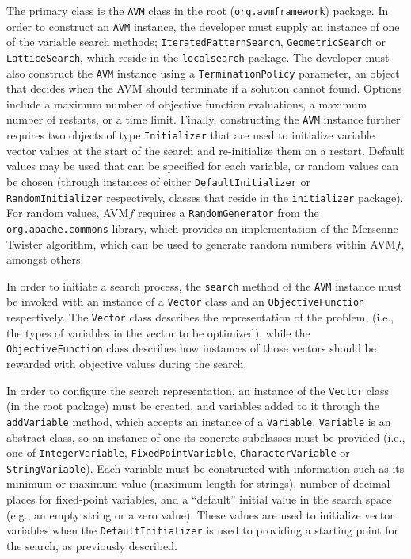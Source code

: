 \documentclass{llncs}
\newcommand{\name}{AVM\hspace{-1pt}$f$\xspace}
\newcommand{\inlineheading}[1]{\vspace{1mm} \noindent {\bf #1.}}
\begin{document}
\begin{sloppypar}
\inlineheading{Configuring an AVM search} The primary class is the {\tt AVM} class in the root ({\tt org.avmframework}) package. In order to construct an {\tt AVM} instance, the developer must supply an instance of one of the variable search methods; {\tt IteratedPatternSearch}, {\tt GeometricSearch} or {\tt LatticeSearch}, which reside in the {\tt localsearch} package. The developer must also construct the {\tt AVM} instance using a {\tt TerminationPolicy} parameter, an object that decides when the AVM should terminate if a solution cannot found. Options include a maximum number of objective function evaluations, a maximum number of restarts, or a time limit. Finally, constructing the {\tt AVM} instance further requires two objects of type {\tt Initializer} that are used to initialize variable vector values at the start of the search and re-initialize them on a restart. Default values may be used that can be specified for each variable, or random values can be chosen (through instances of either {\tt DefaultInitializer} or {\tt RandomInitializer} respectively, classes that reside in the {\tt initializer} package). For random values, \name requires a {\tt RandomGenerator} from the {\tt org.apache.commons} library, which provides an implementation of the Mersenne Twister algorithm, which can be used to generate random numbers within \name, amongst others.
\end{sloppypar}

\begin{sloppypar}
In order to initiate a search process, the {\tt search} method of the {\tt AVM} instance must be invoked with an instance of a {\tt Vector} class and an {\tt ObjectiveFunction} respectively. The {\tt Vector} class describes the representation of the problem,
(i.e., the types of variables in the vector to be optimized), while the {\tt ObjectiveFunction} class describes how instances of those vectors should be rewarded with objective values during the search.
\end{sloppypar}

\begin{sloppypar}
\inlineheading{Representation} In order to configure the search representation, an instance of the {\tt Vector} class (in the root package) must be created, and variables added to it through the {\tt addVariable} method, which accepts an instance of a {\tt Variable}. {\tt Variable} is an abstract class, so an instance of one its concrete subclasses must be provided (i.e., one of {\tt IntegerVariable}, {\tt FixedPointVariable}, {\tt CharacterVariable} or {\tt StringVariable}). Each variable must be constructed with information such as its minimum or maximum value (maximum length for strings), number of decimal places for fixed-point variables, and a ``default'' initial value in the search space (e.g., an empty string or a zero value). These values are used to initialize vector variables when the {\tt DefaultInitializer} is used to providing a starting point for the search, as previously described.
\end{sloppypar}
\end{document}
